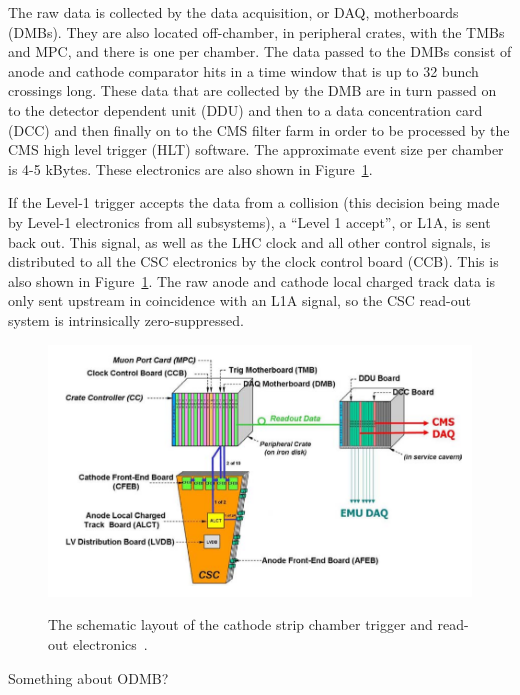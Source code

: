 The raw data is collected by the data acquisition, or DAQ, motherboards (DMBs).  They are also located off-chamber, in peripheral crates, with the TMBs and MPC, and there is one per chamber.  The data passed to the DMBs consist of anode and cathode comparator hits in a time window that is up to 32 bunch crossings long.  These data that are collected by the DMB are in turn passed on to the detector dependent unit (DDU) and then to a data concentration card (DCC) and then finally on to the CMS filter farm in order to be processed by the CMS high level trigger (HLT) software.  The approximate event size per chamber is 4-5 kBytes.  These electronics are also shown in Figure~\ref{figapp:CSCreadout}.

If the Level-1 trigger accepts the data from a collision (this decision being made by Level-1 electronics from all subsystems), a ``Level 1 accept'', or L1A, is sent back out.  This signal, as well as the LHC clock and all other control signals, is distributed to all the CSC electronics by the clock control board (CCB).  This is also shown in Figure~\ref{figapp:CSCreadout}.  The raw anode and cathode local charged track data is only sent upstream in coincidence with an L1A signal, so the CSC read-out system is intrinsically zero-suppressed.  

\begin{figure}[!Hh]
       \includegraphics[scale=0.5]{Figures/CSCreadout.png} \\
       \caption[A schematic of the cathode strip chamber electronic trigger and readout system.]{The schematic layout of the cathode strip chamber trigger and read-out electronics~\cite{CMSdetector}.}
\label{figapp:CSCreadout}
\end{figure}


Something about ODMB?



